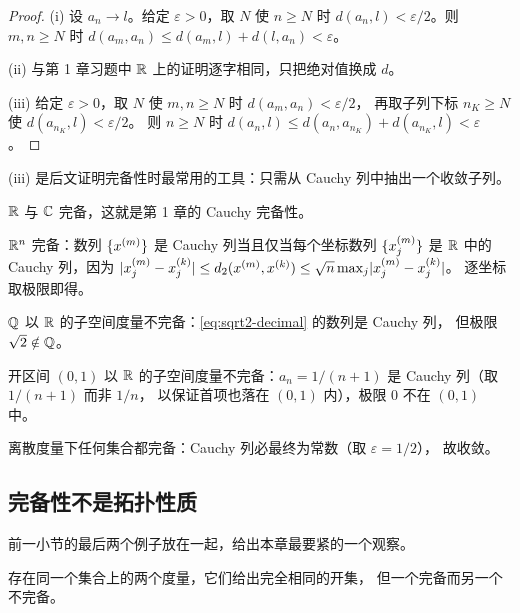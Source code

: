 \begin{proof}
  (i) 设 \(a_{n} \to l\)。给定 \(\varepsilon>0\)，取 \(N\) 使 \(n \ge N\) 时
  \(d(a_{n},l)<\varepsilon/2\)。则 \(m,n \ge N\) 时
  \(d(a_{m},a_{n}) \le d(a_{m},l)+d(l,a_{n}) < \varepsilon\)。

  (ii) 与第 1 章习题中 \(\mathbb{R}\) 上的证明逐字相同，只把绝对值换成 \(d\)。

  (iii) 给定 \(\varepsilon>0\)，取 \(N\) 使 \(m,n \ge N\) 时 \(d(a_{m},a_{n})<\varepsilon/2\)，
  再取子列下标 \(n_{K} \ge N\) 使 \(d(a_{n_{K}},l)<\varepsilon/2\)。
  则 \(n \ge N\) 时 \(d(a_{n},l) \le d(a_{n},a_{n_{K}})+d(a_{n_{K}},l)<\varepsilon\)。
\end{proof}

(iii) 是后文证明完备性时最常用的工具：只需从 Cauchy 列中抽出一个收敛子列。

\begin{example}[完备与不完备]
  \label{ex:complete-examples}
  \begin{worked}
    \(\mathbb{R}\) 与 \(\mathbb{C}\) 完备，这就是第 1 章的 Cauchy 完备性。

    \(\mathbb{R}^{n}\) 完备：数列 \(\{x^{(m)}\}\) 是 Cauchy 列当且仅当每个坐标数列
    \(\{x^{(m)}_{j}\}\) 是 \(\mathbb{R}\) 中的 Cauchy 列，因为
    \(\lvert x^{(m)}_{j}-x^{(k)}_{j}\rvert \le d_{2}(x^{(m)},x^{(k)}) \le \sqrt{n}\max_{j}\lvert x^{(m)}_{j}-x^{(k)}_{j}\rvert\)。
    逐坐标取极限即得。

    \(\mathbb{Q}\) 以 \(\mathbb{R}\) 的子空间度量不完备：\cref{eq:sqrt2-decimal} 的数列是 Cauchy 列，
    但极限 \(\sqrt{2} \notin \mathbb{Q}\)。

    开区间 \((0,1)\) 以 \(\mathbb{R}\) 的子空间度量不完备：\(a_{n} = 1/(n+1)\) 是 Cauchy 列（取 \(1/(n+1)\) 而非 \(1/n\)，
    以保证首项也落在 \((0,1)\) 内），极限 \(0\) 不在 \((0,1)\) 中。

    离散度量下任何集合都完备：Cauchy 列必最终为常数（取 \(\varepsilon = 1/2\)），
    故收敛。
  \end{worked}
\end{example}

\subsection*{完备性不是拓扑性质}

前一小节的最后两个例子放在一起，给出本章最要紧的一个观察。

\begin{theorem}
  \label{thm:complete-not-topological}
  存在同一个集合上的两个度量，它们给出完全相同的开集，
  但一个完备而另一个不完备。
\end{theorem}

